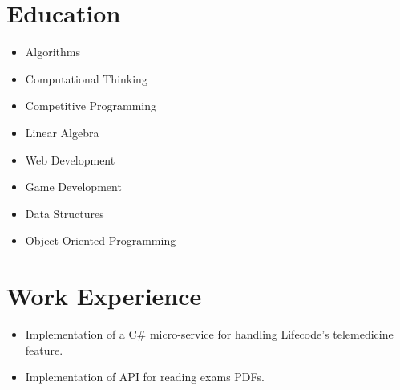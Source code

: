 \documentclass[11pt,a4paper,sans]{moderncv}        %
\begin{document}
\vspace*{-1.05mm}
\makecvtitle
\vspace*{-10mm}

\section{Education}
{}{}
\vspace{-1.5em}\begin{small}
 \begin{multicols}{2}
    \begin{itemize}
\item Algorithms
\item Computational Thinking
\item Competitive Programming
\item Linear Algebra

    \end{itemize}
\end{multicols}\end{small}

\vspace{+1.0em}

{}{}
\vspace{-1.5em}\begin{small}
 \begin{multicols}{2}
    \begin{itemize}
\item Web Development
\item Game Development
\item Data Structures 
\item Object Oriented Programming
    \end{itemize}
\end{multicols}\end{small}

\section{Work Experience}
\vspace{-1.5em}\begin{small}
    \begin{itemize}
\item Implementation of a C\# micro-service for handling Lifecode's telemedicine feature.
\item Implementation of API for reading exams PDFs.
    \end{itemize}
\end{small}
\end{document}
